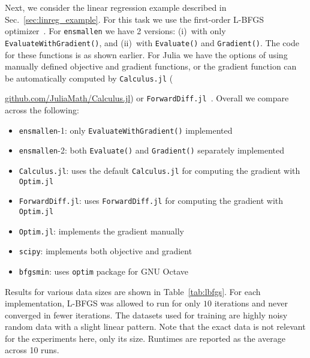 \documentclass{article}
\begin{document}
Next, we consider the linear regression example described in Sec.~\ref{sec:linreg_example}.
For this task we use the first-order L-BFGS optimizer~\cite{zhu1997algorithm}.
For {\tt ensmallen} we have 2 versions:
(i)~with only {\tt EvaluateWithGradient()},
and
(ii)~with {\tt Evaluate()} and {\tt Gradient()}.
The code for these functions is as shown earlier.
For Julia we have the options of using manually defined objective and gradient functions,
or the gradient function can be automatically computed by 
{\tt Calculus.jl}
({\href{https://github.com/JuliaMath/Calculus.jl}{\footnotesize github.com/JuliaMath/Calculus.jl})
or {\tt ForwardDiff.jl}~\cite{RevelsLubinPapamarkou2016}.
Overall we compare across the following:

\vspace*{-0.3em}
\begin{itemize} \itemsep -1pt
  \item {\tt ensmallen}-1: only {\tt EvaluateWithGradient()} implemented
  \item {\tt ensmallen}-2: both {\tt Evaluate()} and {\tt Gradient()} separately
implemented
  \item {\tt Calculus.jl}: uses the default {\tt Calculus.jl} for
computing the gradient with {\tt Optim.jl}
  \item {\tt ForwardDiff.jl}: uses {\tt ForwardDiff.jl} for computing
the gradient with {\tt Optim.jl}
  \item {\tt Optim.jl}: implements the gradient manually
  \item {\tt scipy}: implements both objective and
gradient
  \item {\tt bfgsmin}: uses {\tt optim} package for GNU Octave
\end{itemize}
\vspace*{-0.3em}

Results for various data sizes are shown in Table~\ref{tab:lbfgs}.  For each
implementation, L-BFGS was allowed to run for only $10$ iterations and never
converged in fewer iterations.  The datasets used for training are highly noisy random
data with a slight linear pattern. Note that the exact data is not relevant
for the experiments here, only its size.  Runtimes are reported as the
average across 10 runs.

}
\end{document}
